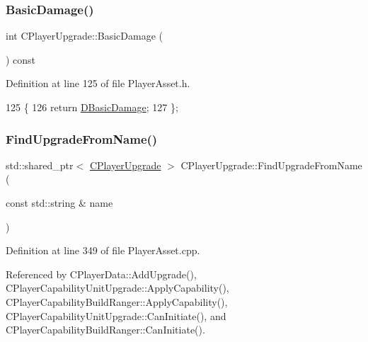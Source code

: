 \subsubsection{\texorpdfstring{Basic\+Damage()}{BasicDamage()}}
{\footnotesize\ttfamily int C\+Player\+Upgrade\+::\+Basic\+Damage (\begin{DoxyParamCaption}{ }\end{DoxyParamCaption}) const\hspace{0.3cm}{\ttfamily [inline]}}



Definition at line 125 of file Player\+Asset.\+h.


\begin{DoxyCode}
125                                \{
126             \textcolor{keywordflow}{return} \hyperlink{classCPlayerUpgrade_a914ae5e3de84921eaf060b5696478489}{DBasicDamage};  
127         \};
\end{DoxyCode}
\hypertarget{classCPlayerUpgrade_af47a08aba3a1a5b2cefacef24065a82e}{}\label{classCPlayerUpgrade_af47a08aba3a1a5b2cefacef24065a82e} 
\subsubsection{\texorpdfstring{Find\+Upgrade\+From\+Name()}{FindUpgradeFromName()}}
{\footnotesize\ttfamily std\+::shared\+\_\+ptr$<$ \hyperlink{classCPlayerUpgrade}{C\+Player\+Upgrade} $>$ C\+Player\+Upgrade\+::\+Find\+Upgrade\+From\+Name (\begin{DoxyParamCaption}\item[{const std\+::string \&}]{name }\end{DoxyParamCaption})\hspace{0.3cm}{\ttfamily [static]}}



Definition at line 349 of file Player\+Asset.\+cpp.



Referenced by C\+Player\+Data\+::\+Add\+Upgrade(), C\+Player\+Capability\+Unit\+Upgrade\+::\+Apply\+Capability(), C\+Player\+Capability\+Build\+Ranger\+::\+Apply\+Capability(), C\+Player\+Capability\+Unit\+Upgrade\+::\+Can\+Initiate(), and C\+Player\+Capability\+Build\+Ranger\+::\+Can\+Initiate().


